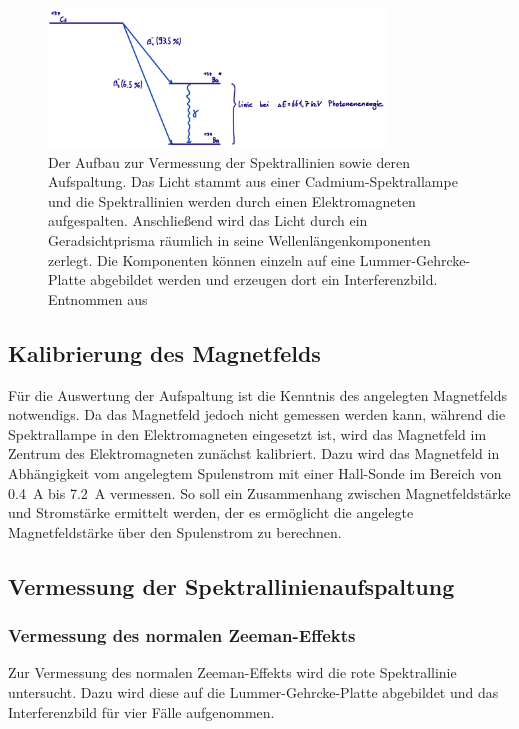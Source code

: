         \FloatBarrier

        \begin{figure}[h]
          \centering
          \includegraphics[width = 0.8\textwidth]{pictures/Aufbau.png}
          \caption{Der Aufbau zur Vermessung der Spektrallinien sowie deren Aufspaltung. Das Licht stammt aus einer Cadmium-Spektrallampe und die Spektrallinien werden durch einen Elektromagneten aufgespalten. Anschließend wird das Licht durch ein Geradsichtprisma räumlich in seine Wellenlängenkomponenten zerlegt. Die Komponenten können einzeln auf eine Lummer-Gehrcke-Platte abgebildet werden und erzeugen dort ein Interferenzbild. Entnommen aus \cite{tu_dortmund_versuchsanleitung_2021-5}}
          \label{fig:Aufbau}
        \end{figure}
    
        \FloatBarrier

    

    \subsection{Kalibrierung des Magnetfelds}
        Für die Auswertung der Aufspaltung ist die Kenntnis des angelegten Magnetfelds notwendigs. Da das Magnetfeld jedoch nicht gemessen werden kann, während die Spektrallampe in den Elektromagneten 
        eingesetzt ist, wird das Magnetfeld im Zentrum des Elektromagneten zunächst kalibriert. Dazu wird das Magnetfeld in Abhängigkeit vom angelegtem Spulenstrom mit einer Hall-Sonde im Bereich von 
        \SI{0.4}{\ampere} bis \SI{7.2}{\ampere} vermessen. So soll ein Zusammenhang zwischen Magnetfeldstärke und Stromstärke ermittelt werden, der es ermöglicht die angelegte Magnetfeldstärke über den 
        Spulenstrom zu berechnen.   

    \subsection{Vermessung der Spektrallinienaufspaltung}
        \subsubsection*{Vermessung des normalen Zeeman-Effekts}
            Zur Vermessung des normalen Zeeman-Effekts wird die rote Spektrallinie untersucht. Dazu wird diese auf die Lummer-Gehrcke-Platte abgebildet und das Interferenzbild für vier Fälle aufgenommen.
            
